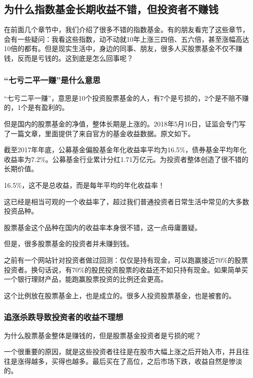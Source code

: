 
\subsection{为什么指数基金长期收益不错，但投资者不赚钱}
在前面几个章节中，我们介绍了很多不错的指数基金。有的朋友看完了这些章节，会有一些疑问：我看这些指数，动不动就10年上涨三四倍、五六倍，甚至涨幅高达10倍的都有。但是现实生活中，身边的同事、朋友，很多人买股票基金不仅不赚钱，反而是亏钱的。这到底是怎么回事呢？

\subsubsection{“七亏二平一赚”是什么意思}

“七亏二平一赚”，意思是10个投资股票基金的人，有7个是亏损的，2个是不赔不赚的，1个是有盈利的。

但是国内的股票基金的净值，整体长期是上涨的。2018年5月16日，证监会专门写了一篇文章，里面提供了来自官方的基金收益数据。原文如下。

{\kaishu 截至2017年年底，公募基金偏股基金年化收益率平均为16.5\%，债券基金平均年化收益率为7.2\%。公募基金行业累计分红1.71万亿元。为投资者整体创造了很不错的长期价值。}

16.5\%，这不是总收益，而是每年平均的年化收益率！

这已经是相当可观的一个收益率了，超过我们普通投资者日常生活中常见的大多数投资品种。

股票基金这个品种在国内的收益率本身很不错，这一点毋庸置疑。

但是，很多股票基金的投资者并未赚到钱。

之前有一个网站针对投资者做过回测：仅仅是持有现金，可以跑赢接近70\%的股票投资者。换句话说，有70\%的股民投资股票的收益还不如只持有现金。如果简单买一个银行理财产品，能跑赢股票投资的比例还会更高。

这个比例放在股票基金上，也是成立的。很多人投资股票基金，也是被套的。

\subsubsection{追涨杀跌导致投资者的收益不理想}

为什么股票基金整体是赚钱的，但是股票基金投资者是亏损的呢？

一个很重要的原因，就是这些投资者往往是在股市大幅上涨之后开始入市，并且往往是涨得越多，买得也越多。最后买在了高位，之后市场下跌，收益自然是惨淡的。

